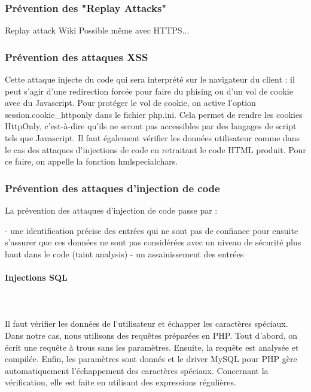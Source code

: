 \documentclass[a4paper]{article}
\begin{document}
		\subsubsection{Prévention des "Replay Attacks"}

		Replay attack Wiki
		Possible même avec HTTPS...
 		
 		\subsubsection{Prévention des attaques XSS}
 		
Cette attaque injecte du code qui sera interprété sur le navigateur du client : il peut s'agir d'une redirection forcée pour faire 
du phising ou d'un vol de cookie avec du Javascript.
Pour protéger le vol de cookie, on active l'option session.cookie\_httponly dans le fichier php.ini.
Cela permet de rendre les cookies HttpOnly, c'est-à-dire qu'ils ne seront pas accessibles par des langages de script tels que Javascript.
Il faut également vérifier les données utilisateur comme dans le cas des attaques d'injections de code en retraitant le code
HTML produit. Pour ce faire, on appelle la fonction hmlspecialchars.
 		
		\subsubsection{Prévention des attaques d'injection de code}
		
La prévention des attaques d'injection de code passe par :
\begin{itemize}
- une identification précise des entrées qui ne sont pas de confiance pour ensuite
s'assurer que ces données ne sont pas considérées avec un niveau de sécurité plus
haut dans le code (taint analysis) 
- un assainissement des entrées
\end{itemize}
		
\paragraph{Injections SQL}
~~\\
\\
Il faut vérifier les données de l'utilisateur et échapper les caractères spéciaux.
Dans notre cas, nous utilisons des requêtes préparées en PHP.
Tout d'abord, on écrit une requête à trous sans les paramètres.
Ensuite, la requête est analysée et compilée.
Enfin, les paramètres sont donnés et le driver MySQL pour PHP gère automatiquement l'échappement des caractères spéciaux.
Concernant la vérification, elle est faite en utilisant des expressions régulières.			
		
\end{document}
